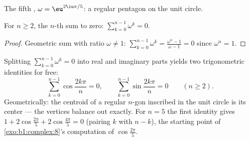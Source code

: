\begin{omfigure}

{\small The fifth , $\omega = \eu^{2\iu\pi/5}$: a
regular pentagon on the unit circle.}
\end{omfigure}

\begin{proposition}\label{prop:b1:complex:sumroots}
For $n \geq 2$, the $n$-th  sum to zero:
$\sum_{k=0}^{n-1} \omega^k = 0$.
\end{proposition}

\begin{proof}
Geometric sum with ratio $\omega \neq 1$:
$\sum_{k=0}^{n-1} \omega^k = \frac{\omega^n - 1}{\omega - 1} = 0$
since $\omega^n = 1$.
\end{proof}

\begin{example}\label{ex:b1:complex:sumrootsparts}
Splitting $\sum_{k=0}^{n-1}\omega^k = 0$ into real and imaginary
parts yields two trigonometric identities for free:
\[
\sum_{k=0}^{n-1}\cos\frac{2k\pi}n = 0,
\qquad
\sum_{k=0}^{n-1}\sin\frac{2k\pi}n = 0
\qquad (n \geq 2).
\]
Geometrically: the centroid of a regular $n$-gon inscribed in the
unit circle is its center --- the vertices balance out exactly.
For $n = 5$ the first identity gives $1 + 2\cos\frac{2\pi}5 +
2\cos\frac{4\pi}5 = 0$ (pairing $k$ with $n - k$), the starting
point of \cref{exo:b1:complex:8}'s computation of
$\cos\frac{2\pi}5$.
\end{example}

